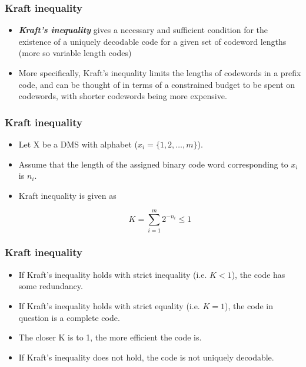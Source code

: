 \documentclass[a4]{beamer}
\begin{document}
\begin{frame}
\frametitle{Kraft inequality}
\begin{itemize}
	\item \textbf{\emph{Kraft's inequality}} gives a necessary and sufficient condition for the existence of a uniquely decodable code for a given set of codeword lengths (more so variable length codes)
	
	\item More specifically, Kraft's inequality limits the lengths of codewords in a prefix code, and can be thought of in terms of a constrained budget to be spent on codewords, with shorter codewords being more expensive.
	
	
\end{itemize}
\end{frame}
\begin{frame}
\frametitle{Kraft inequality}
\begin{itemize}
\item Let X be a DMS with alphabet ($x _i = \{1, 2, \ldots ,m\}$). \item Assume that the length of the assigned binary
code word corresponding to $x_i$ is $n_i$.
\item Kraft inequality is given as

\[ K = \sum^{m}_{i=1}2^{-n_i} \leq 1 \]

\end{itemize}
\end{frame}
\begin{frame}
\frametitle{Kraft inequality}
\begin{itemize}
\item If Kraft's inequality holds with strict inequality (i.e. $K < 1$), the code has some redundancy.
\item If Kraft's inequality holds with strict equality (i.e. $K = 1$), the code in question is a complete code.
\item The closer K is to 1, the more efficient the code is.
\item If Kraft's inequality does not hold, the code is not uniquely decodable.
\end{itemize}
\end{frame}
\end{document}
